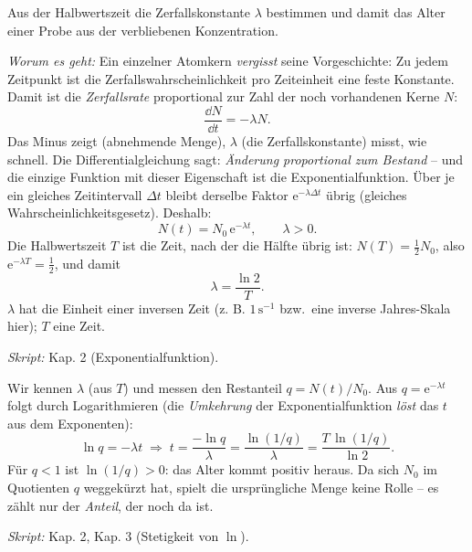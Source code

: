 

Aus der Halbwertszeit die Zerfallskonstante $\lambda$ bestimmen und damit
das Alter einer Probe aus der verbliebenen Konzentration.

\begin{werkzeugkasten}
\emph{Worum es geht:} Ein einzelner Atomkern \emph{vergisst} seine
Vorgeschichte: Zu jedem Zeitpunkt ist die Zerfallswahrscheinlichkeit pro
Zeiteinheit eine feste Konstante. Damit ist die \emph{Zerfallsrate}
proportional zur Zahl der noch vorhandenen Kerne $N$:
\begin{equation*}
  \frac{\dd N}{\dd t}=-\lambda N .
\end{equation*}
Das Minus zeigt (abnehmende Menge), $\lambda$ (die Zerfallskonstante) misst,
wie schnell. Die Differentialgleichung sagt: \emph{Änderung proportional zum
Bestand} -- und die einzige Funktion mit dieser Eigenschaft ist die
Exponentialfunktion. Über je ein gleiches Zeitintervall $\Delta t$ bleibt
derselbe Faktor $\mathrm e^{-\lambda\Delta t}$ übrig (gleiches
Wahrscheinlichkeitsgesetz). Deshalb:
\begin{equation*}
  N(t)=N_0\,\mathrm e^{-\lambda t}, \qquad \lambda>0 .
\end{equation*}
Die Halbwertszeit $T$ ist die Zeit, nach der die Hälfte übrig ist:
$N(T)=\tfrac12 N_0$, also $\mathrm e^{-\lambda T}=\tfrac12$, und damit
\begin{equation*}
  \lambda=\frac{\ln 2}{T}.
\end{equation*}
$\lambda$ hat die Einheit einer inversen Zeit (z. B. $\mathrm{1\,s^{-1}}$
bzw.\ eine inverse Jahres-Skala hier); $T$ eine Zeit.

\textit{Skript:} Kap. 2 (Exponentialfunktion).
\end{werkzeugkasten}

\begin{werkzeugkasten}
Wir kennen $\lambda$ (aus $T$) und messen den Restanteil $q=N(t)/N_0$. Aus
$q=\mathrm e^{-\lambda t}$ folgt durch Logarithmieren (die \emph{Umkehrung}
der Exponentialfunktion \emph{löst} das $t$ aus dem Exponenten):
\begin{equation*}
  \ln q=-\lambda t
  \;\Rightarrow\;
  t=\frac{-\ln q}{\lambda}
  =\frac{\ln(1/q)}{\lambda}
  =\frac{T\,\ln(1/q)}{\ln 2}.
\end{equation*}
Für $q<1$ ist $\ln(1/q)>0$: das Alter kommt positiv heraus. Da sich $N_0$
im Quotienten $q$ weggekürzt hat, spielt die ursprüngliche Menge keine
Rolle -- es zählt nur der \emph{Anteil}, der noch da ist.

\textit{Skript:} Kap. 2, Kap. 3 (Stetigkeit von $\ln$).
\end{werkzeugkasten}

